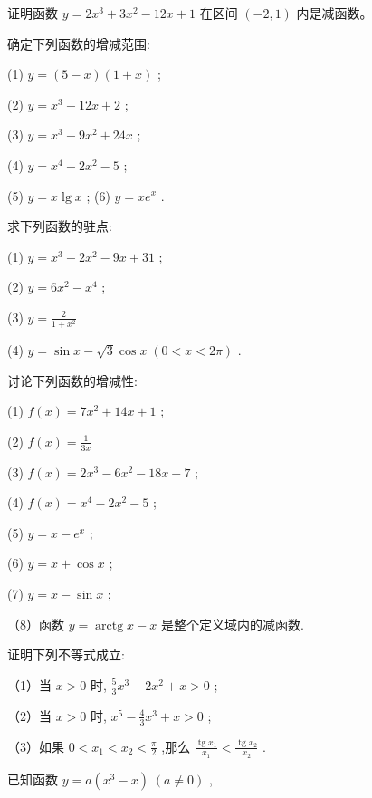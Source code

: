\documentclass[lang=cn,newtx,12pt,scheme=chinese]{elegantbook}
\begin{document}
\begin{problemset}[习 题 十 一]

\item 证明函数 \(y = 2{x}^{3} + 3{x}^{2} - {12x} + 1\) 在区间 \(\left( {-2,1}\right)\) 内是减函数。

\item 确定下列函数的增减范围:

(1) \(y = \left( {5 - x}\right) \left( {1 + x}\right)\) ;

(2) \(y = {x}^{3} - {12x} + 2\) ;

(3) \(y = {x}^{3} - 9{x}^{2} + {24x}\) ;

(4) \(y = {x}^{4} - 2{x}^{2} - 5\) ;

(5) \(y = x\lg x\) ; (6) \(y = x{e}^{x}\) .

\item 求下列函数的驻点:

(1) \(y = {x}^{3} - 2{x}^{2} - {9x} + {31}\) ;

(2) \(y = 6{x}^{2} - {x}^{4}\) ;

(3) \(y = \frac{2}{1 + {x}^{2}}\)

(4) \(y = \sin x - \sqrt{3}\cos x\;\left( {0 < x < {2\pi }}\right)\) .

\item 讨论下列函数的增减性:

(1) \(f\left( x\right) = 7{x}^{2} + {14x} + 1\) ;

(2) \(f\left( x\right) = \frac{1}{3x}\)

(3) \(f\left( x\right) = 2{x}^{3} - 6{x}^{2} - {18x} - 7\) ;

(4) \(f\left( x\right) = {x}^{4} - 2{x}^{2} - 5\) ;

(5) \(y = x - {e}^{x}\) ;

(6) \(y = x + \cos x\) ;

(7) \(y = x - \sin x\) ;

（8）函数 \(y = \operatorname{arctg}x - x\) 是整个定义域内的减函数.

\item 证明下列不等式成立:

（1）当 \(x > 0\) 时, \(\frac{5}{3}{x}^{3} - 2{x}^{2} + x > 0\) ;

（2）当 \(x > 0\) 时, \({x}^{5} - \frac{4}{3}{x}^{3} + x > 0\) ;

（3）如果 \(0 < {x}_{1} < {x}_{2} < \frac{\pi }{2}\) ,那么 \(\frac{\operatorname{tg}{x}_{1}}{{x}_{1}} < \frac{\operatorname{tg}{x}_{2}}{{x}_{2}}\) .

\item 已知函数 \(y = a\left( {{x}^{3} - x}\right) \;\left( {a \neq 0}\right)\) ,


\end{problemset}
\end{document}
